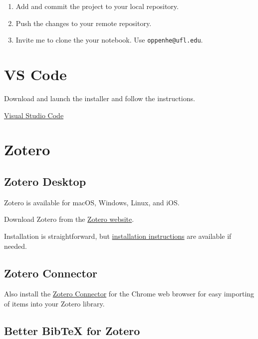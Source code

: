 \documentclass[
  letterpaper,
  DIV=11,
  numbers=noendperiod]{scrreprt}
\providecommand{\tightlist}{%
  \setlength{\itemsep}{0pt}\setlength{\parskip}{0pt}}\usepackage{longtable,booktabs,array}
\begin{document}
\begin{enumerate}
\def\labelenumi{\arabic{enumi}.}
\setcounter{enumi}{4}
\tightlist
\item
  Add and commit the project to your local repository.
\item
  Push the changes to your remote repository.
\item
  Invite me to clone the your notebook. Use \texttt{oppenhe@ufl.edu}.
\end{enumerate}

\section{VS Code}\label{vs-code}

Download and launch the installer and follow the instructions.

\href{https://code.visualstudio.com/}{Visual Studio Code}

\section{Zotero}\label{zotero}

\subsection{Zotero Desktop}\label{zotero-desktop}

Zotero is available for macOS, Windows, Linux, and iOS.

Download Zotero from the \href{https://www.zotero.org/}{Zotero website}.

Installation is straightforward, but
\href{Installation\%20Instructions}{installation instructions} are
available if needed.

\subsection{Zotero Connector}\label{zotero-connector}

Also install the
\href{https://chromewebstore.google.com/detail/zotero-connector/ekhagklcjbdpajgpjgmbionohlpdbjgc?pli=1}{Zotero
Connector} for the Chrome web browser for easy importing of items into
your Zotero library.

\subsection{Better BibTeX for Zotero}\label{better-bibtex-for-zotero}
\end{document}
